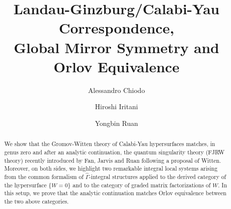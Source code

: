 \documentclass[11pt]{amsart}
\theoremstyle{definition} %
\theoremstyle{remark} %
\def\miyo#1{#1}
\newcommand{\bmu}{\boldsymbol{\mu}}
\newcommand{\hGamma}{\widehat{\Gamma}}
\begin{document}
\title[LG/CY Correspondence, Global Mirror Symmetry 
and Orlov Equivalence]
{Landau-Ginzburg/Calabi-Yau Correspondence, \\
Global Mirror Symmetry and Orlov Equivalence}


\author{Alessandro Chiodo}
\address{Institut de Math\'{e}matiques de Jussieu, 
UMR 7586 CNRS, Universit\'{e} Pierre et Marie Curie, Case 247, 
4 Place Jussieu, 
75252 Paris cedex 05, 
France} 


\author{Hiroshi Iritani}
\address{Department of Mathematics, Graduate School of Science, 
Kyoto University, Kitashirakawa-Oiwake-cho, Sakyo-ku, 
Kyoto, 606-8502, Japan}

\author{Yongbin Ruan}
\address{Department of Mathematics,
University of Michigan, Ann Arbor, MI 48109-1109, USA}


\begin{abstract}
We show that the Gromov-Witten theory of Calabi-Yau hypersurfaces
matches, in genus zero and after an analytic continuation, 
the \miyo{quantum singularity theory (FJRW theory)}  
recently introduced by Fan, Jarvis and Ruan following a proposal of Witten. 
Moreover, on both sides, 
we highlight two remarkable integral local systems 
arising from the common formalism of 
\miyo{$\hGamma$-integral structures} 
applied to the derived category of the hypersurface $\{W=0\}$ 
and to the category of graded matrix factorizations of $W$.
In this setup, we prove that the analytic continuation matches
Orlov equivalence between the two above categories.
\end{abstract}

\maketitle

\let\oldtocsection=\tocsection
\let\oldtocsubsection=\tocsubsection
\end{document}
